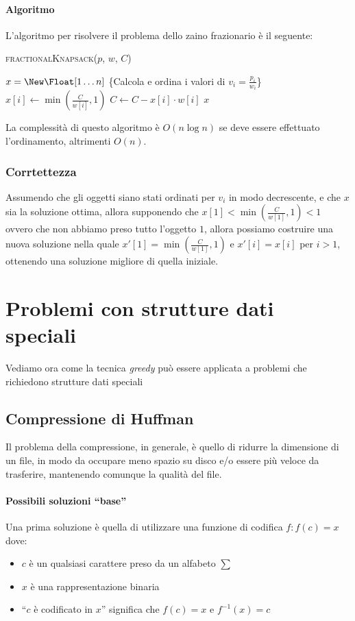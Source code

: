         \paragraph{Algoritmo} L'algoritmo per risolvere il problema dello zaino frazionario è il seguente:
        \begin{algorithm}[H]
            \caption{\Float \textsc{fractionalKnapsack}(\Int[] $p$, \Int[] $w$, \Int $C$)}
            \begin{algorithmic}
                \State \Float[] $x = \New \Float[1 \ldots n]$
                \State \{Calcola e ordina i valori di $v_i = \frac{p_i}{w_i}$\}
                    \State $x[i] \gets \min(\frac{C}{w[i]}, 1)$
                    \State $C \gets C - x[i] \cdot w[i]$
                \EndFor
                \State \Return $x$
            \end{algorithmic}
        \end{algorithm}
        La complessità di questo algoritmo è $O(n\log n)$ se deve essere effettuato l'ordinamento, altrimenti $O(n)$.
        \subsubsection{Corrtettezza}
            Assumendo che gli oggetti siano stati ordinati per $v_i$ in modo decrescente, e che $x$ sia la soluzione ottima, allora supponendo che $x[1] < \min(\frac{C}{w[1]}, 1) < 1$ ovvero che non abbiamo preso tutto l'oggetto $1$, allora possiamo costruire una nuova soluzione nella quale $x'[1]=\min(\frac{C}{w[1]}, 1)$ e $x'[i]=x[i]$ per $i>1$, ottenendo una soluzione migliore di quella iniziale.

\section{Problemi con strutture dati speciali}
    Vediamo ora come la tecnica \textit{greedy} può essere applicata a problemi che richiedono strutture dati speciali
    \subsection{Compressione di Huffman}
        Il problema della compressione, in generale, è quello di ridurre la dimensione di un file, in modo da occupare meno spazio su disco e/o essere più veloce da trasferire, mantenendo comunque la qualità del file.
        \paragraph{Possibili soluzioni ``base''} Una prima soluzione è quella di utilizzare una funzione di codifica $f:f(c)=x$ dove:
        \begin{itemize}
            \item $c$ è un qualsiasi carattere preso da un alfabeto $\sum$
            \item $x$ è una rappresentazione binaria
            \item ``$c$ è codificato in $x$'' significa che $f(c)=x$ e $f^{-1}(x)=c$
        \end{itemize}
